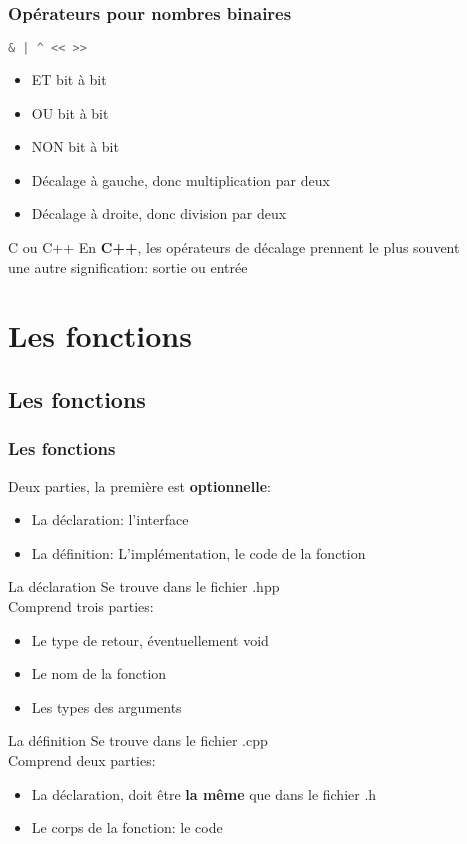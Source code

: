 \documentclass{beamer}
\begin{document}
\begin{frame}[fragile=singleslide,shrink=20]
\frametitle{Opérateurs pour nombres binaires}
\begin{lstlisting}[language=c++]
& | ^ << >>
\end{lstlisting}
\begin{itemize}
\item{ET bit à bit}
\item{OU bit à bit}
\item{NON bit à bit}
\item{Décalage à gauche, donc multiplication par deux}
\item{Décalage à droite, donc division par deux}
\end{itemize}
\begin{block}{C ou C++}
En \textbf{C++}, les opérateurs de décalage prennent le plus souvent \\ 
une autre signification: sortie ou entrée
\end{block}
\end{frame}

\section{Les fonctions}
\subsection{Les fonctions}
\begin{frame}[fragile=singleslide,shrink=20]
\frametitle{Les fonctions}
Deux parties, la première est \textbf{optionnelle}:
\begin{itemize}
\item{La déclaration: l'interface}
\item{La définition: L'implémentation, le code de la fonction}
\end{itemize}

\begin{block}{La déclaration}
Se trouve dans le fichier .hpp \\
Comprend trois parties:
\begin{itemize}
\item{Le type de retour, éventuellement void}
\item{Le nom de la fonction}
\item{Les types des arguments}
\end{itemize}
\end{block}

\begin{block}{La définition}
Se trouve dans le fichier .cpp \\
Comprend deux parties:
\begin{itemize}
\item{La déclaration, doit être \textbf{la même} que dans le fichier .h}
\item{Le corps de la fonction: le code}
\end{itemize}
\end{block}
\end{frame}
\end{document}
